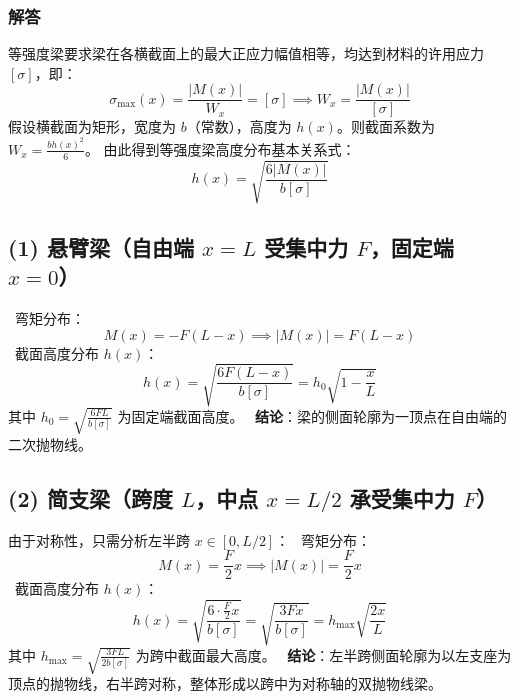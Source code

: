 \documentclass[11pt,a4paper]{ctexrep}
\begin{document}
{\begin{center}
\end{center}

\subsubsection*{解答}

等强度梁要求梁在各横截面上的最大正应力幅值相等，均达到材料的许用应力 $[\sigma]$，即：
\[
\sigma_{\max}(x) = \frac{|M(x)|}{W_x} = [\sigma] \implies W_x = \frac{|M(x)|}{[\sigma]}
\]
假设横截面为矩形，宽度为 $b$（常数），高度为 $h(x)$。则截面系数为 $W_x = \frac{b h(x)^2}{6}$。
由此得到等强度梁高度分布基本关系式：
\[
h(x) = \sqrt{\frac{6 |M(x)|}{b [\sigma]}}
\]

\subsection*{(1) 悬臂梁（自由端 $x=L$ 受集中力 $F$，固定端 $x=0$）}
\noindent\textbullet\ 弯矩分布：
  \[
  M(x) = -F(L-x) \implies |M(x)| = F(L-x)
  \]
\noindent\textbullet\ 截面高度分布 $h(x)$：
  \[
  h(x) = \sqrt{\frac{6F(L-x)}{b[\sigma]}} = h_0 \sqrt{1 - \frac{x}{L}}
  \]
  其中 $h_0 = \sqrt{\frac{6FL}{b[\sigma]}}$ 为固定端截面高度。
\noindent\textbullet\ \textbf{结论}：梁的侧面轮廓为一顶点在自由端的二次抛物线。

\subsection*{(2) 简支梁（跨度 $L$，中点 $x=L/2$ 承受集中力 $F$）}
由于对称性，只需分析左半跨 $x \in [0, L/2]$：
\noindent\textbullet\ 弯矩分布：
  \[
  M(x) = \frac{F}{2} x \implies |M(x)| = \frac{F}{2} x
  \]
\noindent\textbullet\ 截面高度分布 $h(x)$：
  \[
  h(x) = \sqrt{\frac{6 \cdot \frac{F}{2} x}{b [\sigma]}} = \sqrt{\frac{3 F x}{b [\sigma]}} = h_{\max} \sqrt{\frac{2x}{L}}
  \]
  其中 $h_{\max} = \sqrt{\frac{3FL}{2b[\sigma]}}$ 为跨中截面最大高度。
\noindent\textbullet\ \textbf{结论}：左半跨侧面轮廓为以左支座为顶点的抛物线，右半跨对称，整体形成以跨中为对称轴的双抛物线梁。


}
\end{document}

